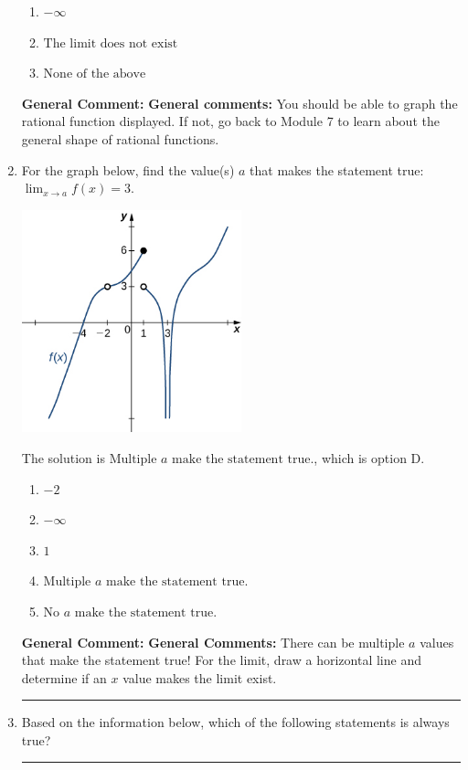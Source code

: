 \documentclass{extbook}[14pt]
\newcommand{\litem}[1]{\item #1

\rule{\textwidth}{0.4pt}}
\begin{document}
\begin{enumerate}
{\begin{enumerate}[label=\Alph*.]
\item \( -\infty \)


\item \( \text{The limit does not exist} \)


\item \( \text{None of the above} \)


\end{enumerate}

\textbf{General Comment:} \textbf{General comments:} You should be able to graph the rational function displayed. If not, go back to Module 7 to learn about the general shape of rational functions.
}
\litem{
For the graph below, find the value(s) $a$ that makes the statement true: $ \displaystyle \lim_{x \rightarrow a} f(x) = 3$.

\begin{center}
    \includegraphics[width=0.5\textwidth]{../Figures/evaluateLimitGraphicallyCopyC.png}
\end{center}


The solution is \( \text{Multiple } a \text{ make the statement true}. \), which is option D.\begin{enumerate}[label=\Alph*.]
\item \( -2 \)


\item \( -\infty \)


\item \( 1 \)


\item \( \text{Multiple } a \text{ make the statement true}. \)


\item \( \text{No } a \text{ make the statement true}. \)


\end{enumerate}

\textbf{General Comment:} \textbf{General Comments:} There can be multiple $a$ values that make the statement true! For the limit, draw a horizontal line and determine if an $x$ value makes the limit exist.
}
\litem{
Based on the information below, which of the following statements is always true?

}
\end{enumerate}
\end{document}
